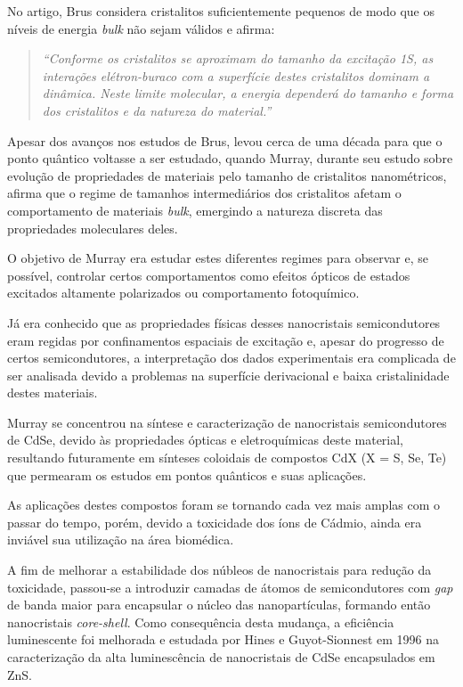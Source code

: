 \par No artigo\cite{introducao3}, Brus considera cristalitos suficientemente pequenos de modo que os níveis de energia \textit{bulk} não sejam válidos e afirma:

\begin{quote}
\textit{“Conforme os cristalitos se aproximam do tamanho da excitação 1S, as interações elétron-buraco com a superfície destes cristalitos dominam a dinâmica. Neste limite molecular, a energia dependerá do tamanho e forma dos cristalitos e da natureza do material.”}
\end{quote}

\par Apesar dos avanços nos estudos de Brus, levou cerca de uma década para que o ponto quântico voltasse a ser estudado, quando Murray\cite{introducao4}, durante seu estudo sobre evolução de propriedades de materiais pelo tamanho de cristalitos nanométricos, afirma que o regime de tamanhos intermediários dos cristalitos afetam o comportamento de materiais \textit{bulk}, emergindo a natureza discreta das propriedades moleculares deles.

\par O objetivo de Murray era estudar estes diferentes regimes para observar e, se possível, controlar certos comportamentos como efeitos ópticos de estados excitados altamente polarizados ou comportamento fotoquímico.

\par Já era conhecido que as propriedades físicas desses nanocristais semicondutores eram regidas por confinamentos espaciais de excitação e, apesar do progresso de certos semicondutores, a interpretação dos dados experimentais era complicada de ser analisada devido a problemas na superfície derivacional e baixa cristalinidade destes materiais.
     
\par Murray se concentrou na síntese e caracterização de nanocristais semicondutores de CdSe, devido às propriedades ópticas e eletroquímicas deste material, resultando futuramente em sínteses coloidais de compostos CdX (X = S, Se, Te) que permearam os estudos em pontos quânticos e suas aplicações.

\par As aplicações destes compostos foram se tornando cada vez mais amplas com o passar do tempo, porém, devido a toxicidade dos íons de Cádmio, ainda era inviável sua utilização na área biomédica.

\par A fim de melhorar a estabilidade dos núbleos de nanocristais para redução da toxicidade, passou-se a introduzir camadas de átomos de semicondutores com \textit{gap} de banda maior para encapsular o núcleo das nanopartículas, formando então nanocristais \textit{core-shell}. Como consequência desta mudança, a eficiência luminescente foi melhorada e estudada por Hines e Guyot-Sionnest em 1996 na caracterização da alta luminescência de nanocristais de CdSe encapsulados em ZnS.

